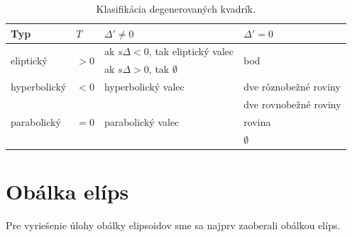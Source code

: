 
\begin{table}[h!]
\centering
\begin{tabular}{|l|l|l|l|}
\hline
Typ & $T$ & $\Delta' \neq  0$ & $\Delta' = 0 $ \\
\hline
\multirow{2}{*}{eliptický} & \multirow{2}{*}{$> 0$} & ak $s\Delta < 0$, tak eliptický valec & \multirow{2}{*}{bod} \\
& & ak $s\Delta > 0$, tak $\emptyset$ &\\
\hline
hyperbolický & $< 0$ & hyperbolický valec & dve rôznobežné roviny \\
\hline
\multirow{3}{*}{parabolický} & \multirow{3}{*}{$= 0$} & \multirow{3}{*}{parabolický valec} & dve rovnobežné roviny \\
& & & rovina \\
& & & $\emptyset$ \\
\hline
\end{tabular}
\caption{Klasifikácia degenerovaných kvadrík.}
\label{tab:degenerate_quadrics}
\end{table}

\section{Obálka elíps}
Pre vyriešenie úlohy obálky elipsoidov sme sa najprv zaoberali obálkou elíps.
